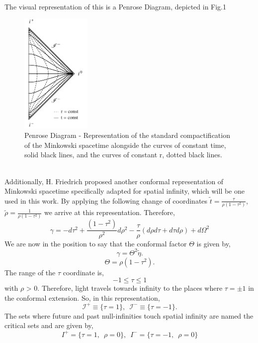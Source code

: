 The visual representation of this is a Penrose Diagram, depicted in Fig.1
\begin{figure}[h]
	\centering \includegraphics[width =0.3\textwidth]{Penrose diagram.pdf}
    \caption{Penrose Diagram - Representation of the standard
      compactification of the Minkowski spacetime alongside the curves of constant
      time, solid black lines, and the curves of constant r, dotted
      black lines.}
\end{figure}
\\
Additionally, H. Friedrich proposed another conformal representation of Minkowski spacetime specifically adapted for spatial infinity, which will be one used in this work. By applying the following change of coordinates $\tilde{t} = \frac{\tau}{\rho(1-\tau^{2})}$, \enspace $\tilde{\rho} = \frac{1}{\rho(1-\tau^{2})}$ we arrive at this representation. Therefore,
$$ \gamma=-d \tau^2+\frac{\left(1-\tau^2\right)}{\rho^2} d\rho^2-\frac{\tau}{\rho}(d \rho d \tau+d \tau d \rho)+d \Omega^2 $$
We are now in the position to say that the conformal factor $\Theta$ is given by,
\begin{equation}\label{eq:gamma}
	\gamma = \Theta^2 \tilde{\eta}.
\end{equation}
\begin{equation}\label{eq:conf-factor}
	\Theta = \rho(1-\tau^2).
\end{equation}
The range of the $\tau$ coordinate is,  
$$ -1 \le \tau \le 1 $$ 
with $\rho$ > 0. Therefore, light travels towards infinity to the places where $\tau = \pm 1$ in the conformal extension. So, in this representation,
$$ \mathscr{I}^+ \equiv \{ \tau = 1 \}, \enspace \mathscr{I}^- \equiv \{ \tau = -1 \}.$$
The sets where future and past null-infinities touch spatial infinity are named the critical sets and are given by,
$$ {I}^+ = \{ \tau = 1, \enspace \rho = 0\}, \enspace {I}^- = \{ \tau = -1, \enspace \rho = 0\}$$

